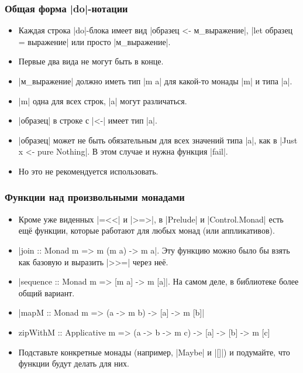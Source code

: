 \documentclass[11pt]{beamer}
\begin{document}
\begin{frame}[fragile]
  \frametitle{Общая форма \haskinline|do|-нотации}
  \begin{itemize}
    \item Каждая строка \haskinline|do|-блока имеет вид \haskinline|образец <- м_выражение|, \haskinline|let образец = выражение| или просто \haskinline|м_выражение|.
    \item Первые два вида не могут быть в конце.
    \item \haskinline|м_выражение| должно иметь тип \haskinline|m a| для какой-то монады \haskinline|m| и типа \haskinline|a|.
    \item \haskinline|m| одна для всех строк, \haskinline|a| могут различаться.
    \item \haskinline|образец| в строке с \haskinline|<-| имеет тип \haskinline|a|.
    \item \haskinline|образец| может не быть обязательным для всех значений типа \haskinline|a|, как в \haskinline|Just x <- pure Nothing|. В этом случае и нужна функция \haskinline|fail|.
    \item Но это не рекомендуется использовать.
  \end{itemize}
\end{frame}

\begin{frame}[fragile]
  \frametitle{Функции над произвольными монадами}
  \begin{itemize}[<+->]
    \item Кроме уже виденных \haskinline|=<<| и \haskinline|>=>|, в \haskinline|Prelude| и \haskinline|Control.Monad| есть ещё функции, которые работают для любых монад (или аппликативов).
    \item \haskinline|join :: Monad m => m (m a) -> m a|. Эту функцию можно было бы взять как базовую и выразить \haskinline|>>=| через неё.
    \item \haskinline|sequence :: Monad m => [m a] -> m [a]|. На самом деле, в библиотеке более общий вариант.
    \item \haskinline[fontsize=\small]|mapM :: Monad m => (a -> m b) -> [a] -> m [b]|
    \item
          \begin{haskell}
    zipWithM :: Applicative m =>
      (a -> b -> m c) -> [a] -> [b] -> m [c]
    \end{haskell}
    \item Подставьте конкретные монады (например, \haskinline|Maybe| и \haskinline|[]|) и подумайте, что функции будут делать для них.
  \end{itemize}
\end{frame}
\end{document}
